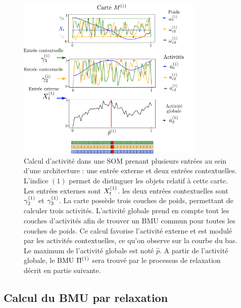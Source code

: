\begin{figure}
\centering
\includegraphics[width=0.8\textwidth]{activite_layers.pdf}
\caption{Calcul d'activité dans une SOM prenant plusieurs entrées au sein d'une architecture : une entrée externe et deux entrées contextuelles. L'indice $(1)$ permet de distinguer les objets relatif à cette carte. Les entrées externes sont $X^{({1})}_t$. les deux entrées contextuelles sont $\gamma^{({1})}_2$ et $\gamma^{({1})}_3$. La carte possède trois couches de poids, permettant de calculer trois activités. L'activité globale prend en compte tout les couches d'activités afin de trouver un BMU commun pour toutes les couches de poids. Ce calcul favorise l'activité externe et est modulé par les activités contextuelles, ce qu'on observe sur la courbe du bas. Le maximum de l'activité globale est noté $\hat{p}$. A partir de l'activité globale, le BMU $\Pi^{({1})}$ sera trouvé par le processus de relaxation décrit en partie suivante.}
\label{fig:activite}
\end{figure}

\subsection{Calcul du BMU par relaxation}

